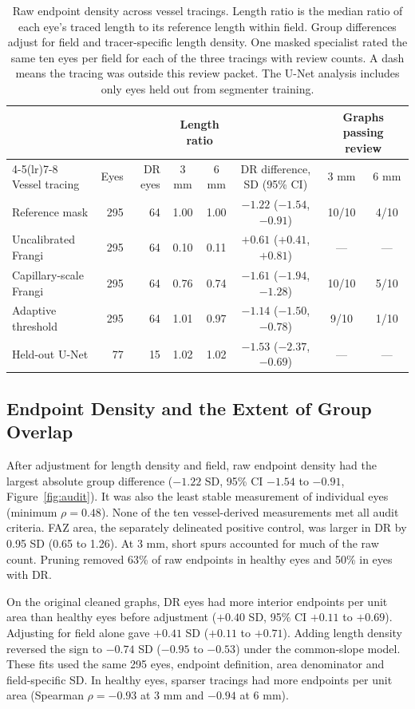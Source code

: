 \documentclass[letterpaper]{article}
\begin{document}
\begin{table}[t]
\centering
\begin{tabular}{lrrccccc}
\toprule
&&&\multicolumn{2}{c}{Length ratio} & & \multicolumn{2}{c}{Graphs passing review}\\
\cmidrule(lr){4-5}\cmidrule(lr){7-8}
Vessel tracing & Eyes & DR eyes & 3 mm & 6 mm & DR difference, SD (95\% CI) & 3 mm & 6 mm\\
\midrule
Reference mask & 295 & 64 & 1.00 & 1.00 & $-1.22$ ($-1.54$, $-0.91$) & 10/10 & 4/10\\
Uncalibrated Frangi & 295 & 64 & 0.10 & 0.11 & $+0.61$ ($+0.41$, $+0.81$) & --- & ---\\
Capillary-scale Frangi & 295 & 64 & 0.76 & 0.74 & $-1.61$ ($-1.94$, $-1.28$) & 10/10 & 5/10\\
Adaptive threshold & 295 & 64 & 1.01 & 0.97 & $-1.14$ ($-1.50$, $-0.78$) & 9/10 & 1/10\\
Held-out U-Net & 77 & 15 & 1.02 & 1.02 & $-1.53$ ($-2.37$, $-0.69$) & --- & ---\\
\bottomrule
\end{tabular}
\caption{Raw endpoint density across vessel tracings. Length ratio is the median ratio of each eye's traced length to its reference length within field. Group differences adjust for field and tracer-specific length density. One masked specialist rated the same ten eyes per field for each of the three tracings with review counts. A dash means the tracing was outside this review packet. The U-Net analysis includes only eyes held out from segmenter training.}
\label{tab:tracer}
\end{table}

\subsection{Endpoint Density and the Extent of Group Overlap}
After adjustment for length density and field, raw endpoint density had the largest absolute group difference ($-1.22$ SD, 95\% CI $-1.54$ to $-0.91$, Figure~\ref{fig:audit}). It was also the least stable measurement of individual eyes (minimum $\rho=0.48$). None of the ten vessel-derived measurements met all audit criteria. FAZ area, the separately delineated positive control, was larger in DR by 0.95 SD (0.65 to 1.26). At 3 mm, short spurs accounted for much of the raw count. Pruning removed 63\% of raw endpoints in healthy eyes and 50\% in eyes with DR.

On the original cleaned graphs, DR eyes had more interior endpoints per unit area than healthy eyes before adjustment ($+0.40$ SD, 95\% CI $+0.11$ to $+0.69$). Adjusting for field alone gave $+0.41$ SD ($+0.11$ to $+0.71$). Adding length density reversed the sign to $-0.74$ SD ($-0.95$ to $-0.53$) under the common-slope model. These fits used the same 295 eyes, endpoint definition, area denominator and field-specific SD. In healthy eyes, sparser tracings had more endpoints per unit area (Spearman $\rho=-0.93$ at 3 mm and $-0.94$ at 6 mm).
\end{document}
